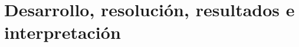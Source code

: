 \chapter{Desarrollo, resolución, resultados e interpretación}


\pagebreak

\pagebreak

\pagebreak

\pagebreak

